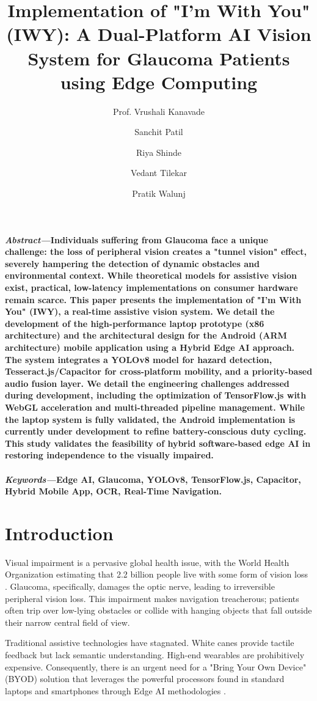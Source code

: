 \documentclass[11pt, a4paper, twocolumn]{article}
\title{Implementation of "I'm With You" (IWY): A Dual-Platform AI Vision System for Glaucoma Patients using Edge Computing}
\author[1]{Prof. Vrushali Kanavade}
\author[2]{Sanchit Patil}
\author[2]{Riya Shinde}
\author[2]{Vedant Tilekar}
\author[2]{Pratik Walunj}
\affil[1]{Assistant Professor, Computer Department, AISSMS College Of Engineering, Pune}
\affil[2]{Student, Computer Department, AISSMS College Of Engineering, Pune}
\date{}
\begin{document}
\maketitle
\thispagestyle{fancy}

\noindent\textit{\textbf{Abstract---}}\textbf{Individuals suffering from Glaucoma face a unique challenge: the loss of peripheral vision creates a "tunnel vision" effect, severely hampering the detection of dynamic obstacles and environmental context. While theoretical models for assistive vision exist, practical, low-latency implementations on consumer hardware remain scarce. This paper presents the implementation of "I'm With You" (IWY), a real-time assistive vision system. We detail the development of the high-performance laptop prototype (x86 architecture) and the architectural design for the Android (ARM architecture) mobile application using a Hybrid Edge AI approach. The system integrates a YOLOv8 model for hazard detection, Tesseract.js/Capacitor for cross-platform mobility, and a priority-based audio fusion layer. We detail the engineering challenges addressed during development, including the optimization of TensorFlow.js with WebGL acceleration and multi-threaded pipeline management. While the laptop system is fully validated, the Android implementation is currently under development to refine battery-conscious duty cycling. This study validates the feasibility of hybrid software-based edge AI in restoring independence to the visually impaired.}
\\\\
\noindent\textit{\textbf{Keywords---}}\textbf{Edge AI, Glaucoma, YOLOv8, TensorFlow.js, Capacitor, Hybrid Mobile App, OCR, Real-Time Navigation.}

\section{Introduction}
Visual impairment is a pervasive global health issue, with the World Health Organization estimating that 2.2 billion people live with some form of vision loss \cite{glaucoma_stats}. Glaucoma, specifically, damages the optic nerve, leading to irreversible peripheral vision loss. This impairment makes navigation treacherous; patients often trip over low-lying obstacles or collide with hanging objects that fall outside their narrow central field of view.

Traditional assistive technologies have stagnated. White canes provide tactile feedback but lack semantic understanding. High-end wearables are prohibitively expensive. Consequently, there is an urgent need for a "Bring Your Own Device" (BYOD) solution that leverages the powerful processors found in standard laptops and smartphones through Edge AI methodologies \cite{edge_ai}.
\end{document}
